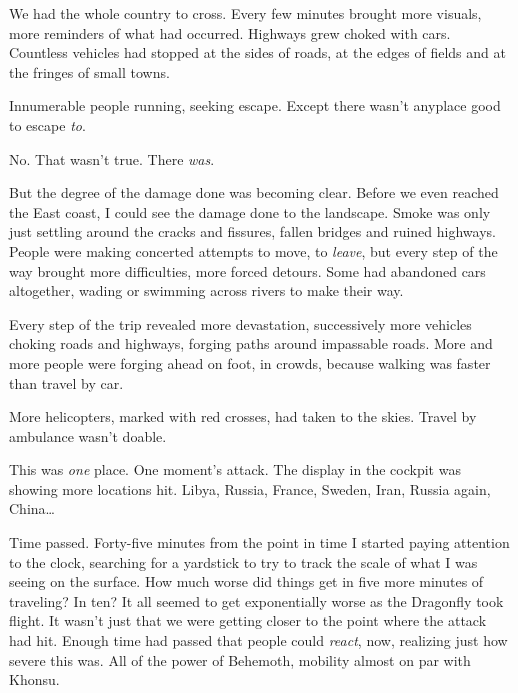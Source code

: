 We had the whole country to cross.  Every few minutes brought more visuals, more reminders of what had occurred.  Highways grew choked with cars.  Countless vehicles had stopped at the sides of roads, at the edges of fields and at the fringes of small towns.



Innumerable people running, seeking escape.  Except there wasn't anyplace good to escape \emph{to}.



No.  That wasn't true.  There \emph{was}.



But the degree of the damage done was becoming clear.  Before we even reached the East coast, I could see the damage done to the landscape.  Smoke was only just settling around the cracks and fissures, fallen bridges and ruined highways.  People were making concerted attempts to move, to \emph{leave}, but every step of the way brought more difficulties, more forced detours.  Some had abandoned cars altogether, wading or swimming across rivers to make their way.



Every step of the trip revealed more devastation, successively more vehicles choking roads and highways, forging paths around impassable roads.  More and more people were forging ahead on foot, in crowds, because walking was faster than travel by car.



More helicopters, marked with red crosses, had taken to the skies.  Travel by ambulance wasn't doable.



This was \emph{one} place.  One moment's attack.  The display in the cockpit was showing more locations hit.  Libya, Russia, France, Sweden, Iran, Russia again, China\ldots



Time passed.  Forty-five minutes from the point in time I started paying attention to the clock, searching for a yardstick to try to track the scale of what I was seeing on the surface.  How much worse did things get in five more minutes of traveling?  In ten?  It all seemed to get exponentially worse as the Dragonfly took flight.  It wasn't just that we were getting closer to the point where the attack had hit.  Enough time had passed that people could \emph{react}, now, realizing just how severe this was.  All of the power of Behemoth, mobility almost on par with Khonsu.



